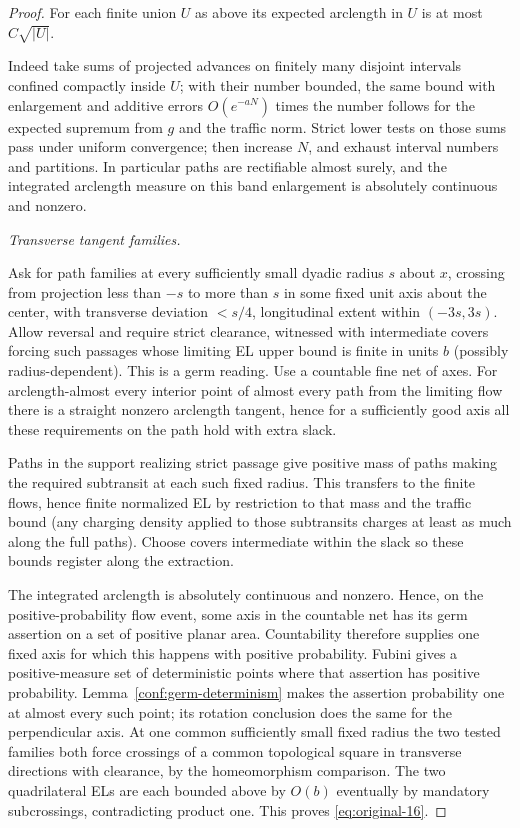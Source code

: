 \begin{proof}
For each finite union \(U\) as above its expected arclength in \(U\) is at most \(C\sqrt{|U|}\).

Indeed take sums of projected advances on finitely many disjoint intervals confined compactly inside
\(U\); with their number bounded, the same bound with enlargement and additive errors \(O(e^{-aN})\)
times the number follows for the expected supremum from \(g\) and the traffic norm. Strict lower
tests on those sums pass under uniform convergence; then increase \(N\), and exhaust interval
numbers and partitions. In particular paths are rectifiable almost surely, and the integrated
arclength measure on this band enlargement is absolutely continuous and nonzero.

\smallskip\noindent\emph{Transverse tangent families.}\par

Ask for path families at every sufficiently small dyadic radius \(s\) about \(x\), crossing from
projection less than \(-s\) to more than \(s\) in some fixed unit axis about the center, with
transverse deviation \(<s/4\), longitudinal extent within \((-3s,3s)\). Allow reversal and require
strict clearance, witnessed with intermediate covers forcing such passages whose limiting EL upper
bound is finite in units \(b\) (possibly radius-dependent). This is a germ reading. Use a countable
fine net of axes. For arclength-almost every interior point of almost every path from the limiting
flow there is a straight nonzero arclength tangent, hence for a sufficiently good axis all these
requirements on the path hold with extra slack.

Paths in the support realizing strict passage give positive mass of paths making the required
subtransit at each such fixed radius. This transfers to the finite flows, hence finite normalized EL
by restriction to that mass and the traffic bound (any charging density applied to those subtransits
charges at least as much along the full paths). Choose covers intermediate within the slack so these
bounds register along the extraction.

The integrated arclength is absolutely continuous and nonzero. Hence,
on the positive-probability flow event, some axis in the countable
net has its germ assertion on a set of positive planar area. Countability
therefore supplies one fixed axis for which this happens with positive
probability. Fubini gives
a positive-measure set of deterministic points where that assertion has
positive probability. Lemma~\ref{conf:germ-determinism} makes the assertion
probability one at almost every such point; its rotation conclusion does
the same for the perpendicular axis. At one common sufficiently small fixed
radius the two tested families both force crossings of a common topological square in transverse
directions with clearance, by the homeomorphism comparison. The two quadrilateral ELs are each
bounded above by \(O(b)\) eventually by mandatory subcrossings, contradicting product one. This
proves \eqref{eq:original-16}.

\end{proof}

